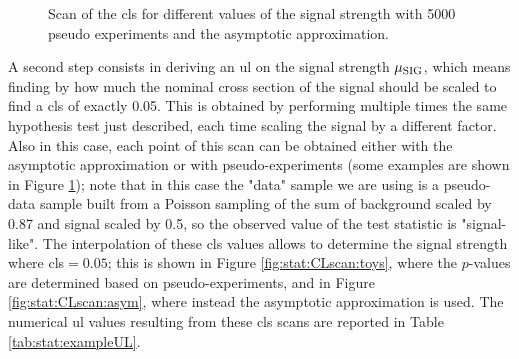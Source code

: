 \begin{figure}[h]
\centering 
{}
\caption{
Scan of the \gls{cls} for different values of the signal strength with  5000 pseudo experiments and  the asymptotic approximation.
}
\label{fig:stat:CLscan}
\end{figure}

A second step consists in deriving an \gls{ul} on the signal strength $\mu_{\rm SIG}$, which means finding by how much the 
nominal cross section of the signal should be scaled to find a \gls{cls} of exactly 0.05. This is obtained by performing multiple times the same hypothesis test just described, each time scaling the signal by a different factor. 
Also in this case, each point of this scan can be obtained either with the asymptotic approximation or with pseudo-experiments (some examples are shown in Figure \ref{fig:stat:CLscan}); note that in this case the "data" sample we are using is a pseudo-data sample built from a Poisson sampling 
of the sum of background scaled by 0.87 and signal scaled by 0.5, so the observed value of the test statistic is "signal-like".
The interpolation of these \gls{cls} values  allows to determine the signal strength where \gls{cls}$=0.05$; 
this is shown in Figure \ref{fig:stat:CLscan:toys}, where the $p$-values are determined based on pseudo-experiments, 
and in Figure \ref{fig:stat:CLscan:asym}, where instead the asymptotic approximation is used.
The numerical \gls{ul} values resulting from these \gls{cls} scans are reported in Table \ref{tab:stat:exampleUL}.


